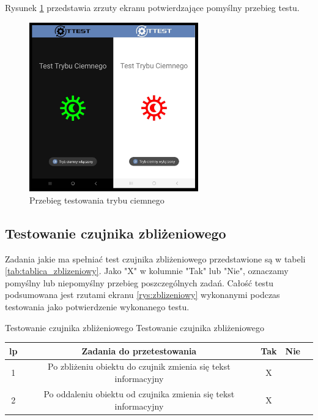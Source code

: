 Rysunek \ref{rys:ciemny} przedstawia zrzuty ekranu potwierdzające pomyślny przebieg testu.

\begin{figure}[!hbt]
	\begin{center}
		\includegraphics[angle=360, width=0.65\textwidth]{rys/punkt5/ciemny.jpg}
		\caption{Przebieg testowania trybu ciemnego}
		\label{rys:ciemny}
	\end{center}
\end{figure}   

\newpage


\subsection{Testowanie czujnika zbliżeniowego}

\hspace{0.60cm}Zadania jakie ma spełniać test czujnika zbliżeniowego przedstawione są w tabeli \ref{tab:tablica_zblizeniowy}. Jako "X" w kolumnie "Tak" lub "Nie", oznaczamy pomyślny lub niepomyślny przebieg poszczególnych zadań. Całość testu podsumowana jest rzutami ekranu \ref{rys:zblizeniowy} wykonanymi podczas testowania jako potwierdzenie wykonanego testu.

\begin{tabela}
	{Testowanie czujnika zbliżeniowego}	%
	{Testowanie czujnika zbliżeniowego}	%
	{
		\begin{tabular}{|c|c|c|c|c|} \hline
			\textbf{lp} & \textbf{Zadania do przetestowania} & \textbf{Tak} & \textbf{Nie} \\ \hline
			1 & Po zbliżeniu obiektu do czujnik zmienia się tekst informacyjny  & X & ~ \\ \hline
			2 & Po oddaleniu obiektu od czujnika zmienia się tekst informacyjny & X & ~ \\ \hline
	\end{tabular}	}
	\label{tab:tablica_zblizeniowy}
\end{tabela}

